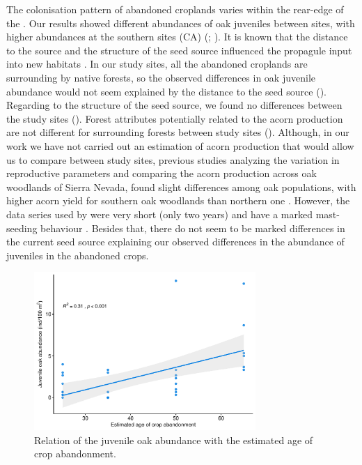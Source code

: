 The colonisation pattern of abandoned croplands varies within the rear-edge of the \Qp. Our results showed different abundances of oak juveniles between sites, with higher abundances at the southern sites (CA) (; ). It is known that the distance to the source and the structure of the seed source influenced the propagule input into new habitats \autocites{Nathan2006LongDistanceDispersal,HewittKellman2002TreeSeed,Kureketal2019DispersalDistance}. In our study sites, all the abandoned croplands are surrounding by native forests, so the observed differences in oak juvenile abundance would not seem explained by the distance to the seed source (). Regarding to the structure of the seed source, we found no differences 
between the study sites (). Forest attributes potentially related to the acorn production \autocite[][\emph{e.g.} tree density, basal area,]{GeaIzquierdoetal2006AcornProduction} are not different for surrounding forests between study sites (). Although, in our work we have not carried out an estimation of acorn production that would allow us to compare between study sites, previous studies analyzing the variation in reproductive parameters and comparing the acorn production across oak woodlands of Sierra Nevada, found slight differences among oak populations, with higher acorn yield for southern oak woodlands than northern one \autocite{Leal2013AnalisisCrecimiento}.  However, the data series used by \citet{Leal2013AnalisisCrecimiento} were very short (only two years) and \Qpy have a marked mast-seeding behaviour \autocites{Bravoetal2008SelviculturaMontes,Gomezetal2001ProblemasRegeneracion}. Besides that, there do not seem to be marked differences in the current seed source explaining our observed differences in the abundance of juveniles in the abandoned crops. 

\begin{figure}
    \centering
    \includegraphics[width=\textwidth,height=6cm,
  keepaspectratio]{img/coloniza/coloniza-ageCrop.pdf}
    \caption{Relation of the juvenile oak abundance with the estimated age of crop abandonment.}
    \label{fig:coloniza:ageCrop}
\end{figure}

